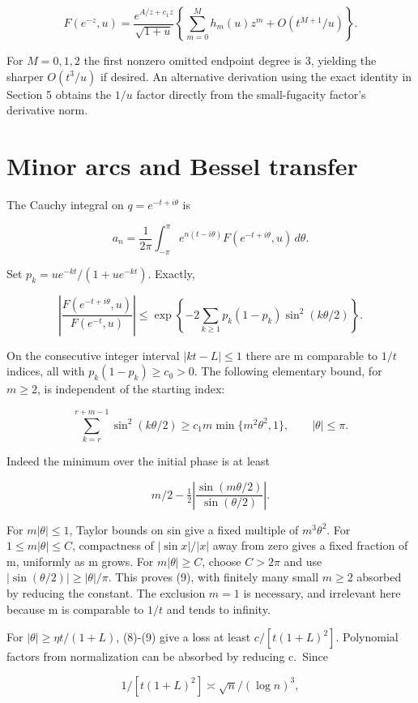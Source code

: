 \documentclass[11pt,letterpaper]{article}
\begin{document}
\[
 F(e^{-z},u)=\frac{e^{A/z+c_1z}}{\sqrt{1+u}}
 \left\{\sum_{m=0}^{M}h_m(u)z^m+O(t^{M+1}/u)\right\}. \tag{7}
\]

For \(M=0,1,2\) the first nonzero omitted endpoint degree is 3, yielding
the sharper \(O(t^3/u)\) if desired. An alternative derivation using the
exact identity in Section 5 obtains the \(1/u\) factor directly from the
small-fugacity factor's derivative norm.

\section{Minor arcs and Bessel
transfer}\label{mfp:minor-arcs-and-bessel-transfer}

The Cauchy integral on \(q=e^{-t+i\theta}\) is

\[
 a_n=\frac1{2\pi}\int_{-\pi}^{\pi}e^{n(t-i\theta)}F(e^{-t+i\theta},u)\,d\theta.
\]

Set \(p_k=ue^{-kt}/(1+ue^{-kt})\). Exactly,

\[
 \left|\frac{F(e^{-t+i\theta},u)}{F(e^{-t},u)}\right|
 \le\exp\left\{-2\sum_{k\ge1}p_k(1-p_k)\sin^2(k\theta/2)\right\}. \tag{8}
\]

On the consecutive integer interval \(|kt-L|\le1\) there are m
comparable to \(1/t\) indices, all with \(p_k(1-p_k)\ge c_0>0\). The
following elementary bound, for \(m\ge2\), is independent of the
starting index:

\[
 \sum_{k=r}^{r+m-1}\sin^2(k\theta/2)
 \ge c_1m\min\{m^2\theta^2,1\},\qquad |\theta|\le\pi. \tag{9}
\]

Indeed the minimum over the initial phase is at least

\[
 m/2-\tfrac12\left|\frac{\sin(m\theta/2)}{\sin(\theta/2)}\right|.
\]

For \(m|\theta|\le1\), Taylor bounds on sin give a fixed multiple of
\(m^3\theta^2\). For \(1\le m|\theta|\le C\), compactness of
\(|\sin x|/|x|\) away from zero gives a fixed fraction of m, uniformly
as m grows. For \(m|\theta|\ge C\), choose \(C>2\pi\) and use
\(|\sin(\theta/2)|\ge|\theta|/\pi\). This proves (9), with finitely many
small \(m\ge2\) absorbed by reducing the constant. The exclusion \(m=1\)
is necessary, and irrelevant here because m is comparable to \(1/t\) and
tends to infinity.

For \(|\theta|\ge\eta t/(1+L)\), (8)-(9) give a loss at least
\(c/[t(1+L)^2]\). Polynomial factors from normalization can be absorbed
by reducing c.~Since

\[
 1/[t(1+L)^2]\asymp\sqrt n/(\log n)^3,
\]
\end{document}

